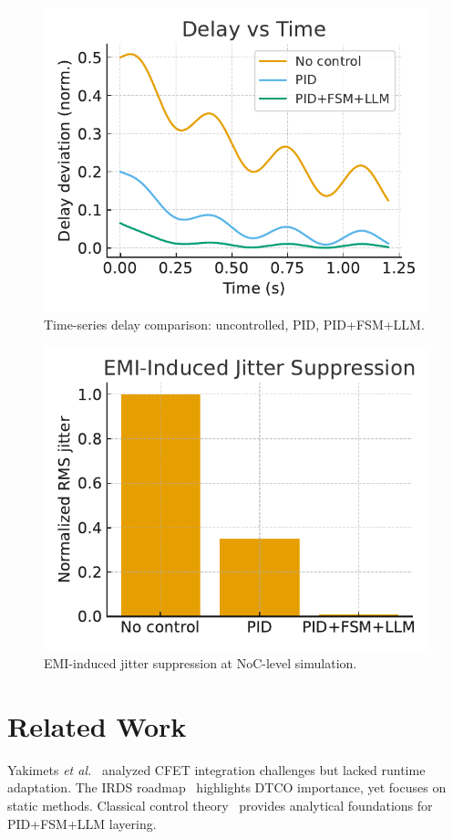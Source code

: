 \documentclass[conference]{IEEEtran}
\begin{document}
\begin{figure}[h]
\centering
\includegraphics[width=0.85\columnwidth]{figs/delay_comp.pdf}
\caption{Time-series delay comparison: uncontrolled, PID, PID+FSM+LLM.}
\label{fig:delay}
\end{figure}

\begin{figure}[h]
\centering
\includegraphics[width=0.85\columnwidth]{figs/emi_jitter.pdf}
\caption{EMI-induced jitter suppression at NoC-level simulation.}
\label{fig:emi}
\end{figure}

\section{Related Work}
Yakimets \textit{et al.}~\cite{yakimets2020cfet} analyzed CFET integration challenges but lacked runtime adaptation.
The IRDS roadmap~\cite{irds2023} highlights DTCO importance, yet focuses on static methods.
Classical control theory~\cite{franklin2015feedback} provides analytical foundations for PID+FSM+LLM layering.
\end{document}
